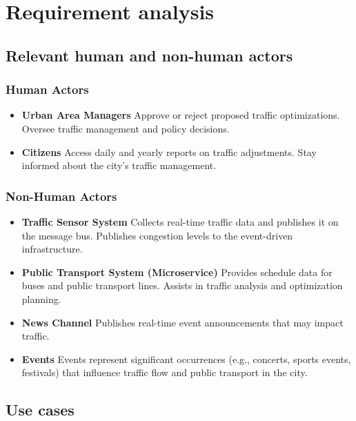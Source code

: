 \documentclass[11.5pt]{article}
\begin{document}
    \section{Requirement analysis}
    \subsection{Relevant human and non-human actors}
    \subsubsection{Human Actors}
        \begin{itemize}
        \item \textbf{Urban Area Managers}
        Approve or reject proposed traffic optimizations.
        Oversee traffic management and policy decisions.
        \item \textbf{Citizens}
        Access daily and yearly reports on traffic adjustments. 
        Stay informed about the city's traffic management.
        \end{itemize}
    \subsubsection{Non-Human Actors}
    \begin{itemize}
        \item \textbf{Traffic Sensor System}
    Collects real-time traffic data and publishes it on the message bus.
    Publishes congestion levels to the event-driven infrastructure.
    \item \textbf{Public Transport System (Microservice)}
    Provides schedule data for buses and public transport lines.
    Assists in traffic analysis and optimization planning.
    \item \textbf {News Channel}
    Publishes real-time event announcements that may impact traffic.
    \item \textbf{Events}
    Events represent significant occurrences (e.g., concerts, sports events, festivals) that influence traffic flow and public transport in the city.
    \end{itemize}
    
    \subsection{Use cases}
\end{document}
